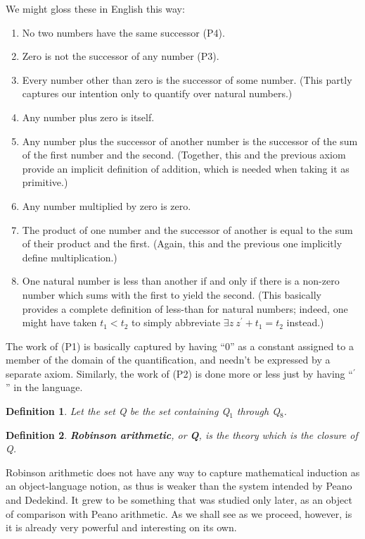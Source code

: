 \documentclass[12pt]{report}
\theoremstyle{nonumberplain}
\newtheorem{definition}{Definition}
\newcommand{\Q}{\textbf{\textup{Q}}}
\newcommand{\defm}[1]{\textbf{#1}\index{#1}}
\begin{document}
We might gloss these in English this way:
\begin{enumerate}[label={Q$_\arabic*$.}]
\item No two numbers have the same successor (P4).
\item Zero is not the successor of any number (P3).
\item Every number other than zero is the successor of some number. (This partly captures our intention only to quantify over natural numbers.)
\item Any number plus zero is itself.
\item Any number plus the successor of another number is the successor of the sum of the first number and the second. (Together, this and the previous axiom provide an implicit definition of addition, which is needed when taking it as primitive.)
\item Any number multiplied by zero is zero.
\item The product of one number and the successor of another is equal to the sum of their product  and the first. (Again, this and the previous one implicitly define multiplication.)
\item One natural number is less than another if and only if there is a non-zero number which sums with the first to yield the second. (This basically provides a complete definition of less-than for natural numbers; indeed, one might have taken $t_1 < t_2$ to simply abbreviate $∃z\ z^{\prime} + t_1 = t_2$ instead.)
\end{enumerate}

\noindent The work of (P1) is basically captured by having ``0'' as a constant assigned to a member of the domain of the quantification, and needn't be expressed by a separate axiom. Similarly, the work of (P2) is done more or less just by having ``${}^{\prime}$'' in the language.

\begin{definition} Let the set \textup{Q} be the set containing \textup{Q$_1$} through \textup{Q$_8$}.
\end{definition}

\begin{definition} \defm{Robinson arithmetic}, or \Q, is the theory which is the closure of  \textup{Q}.
\end{definition}

Robinson arithmetic does not have any way to capture mathematical induction as an object-language notion, as thus is weaker than the system intended by Peano and Dedekind. It grew to be something that was studied only later, as an object of comparison with Peano arithmetic. As we shall see as we proceed, however, is it is already very powerful and interesting on its own.
\end{document}
